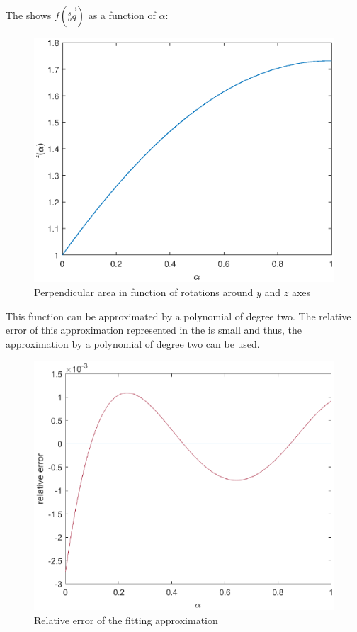 The  shows $f(\vec{ ^s_o q})$ as a function of $\alpha$:
\begin{figure}[H]
	\centering
	\includegraphics[width=1\linewidth]{figures/path_f.eps}
	\caption{Perpendicular area in function of rotations around $y$ and $z$ axes}
	\label{fig:path_alpha}
\end{figure} 
This function can be approximated by a polynomial of degree two. The relative error of this approximation represented in the  is small and thus, the approximation by a polynomial of degree two can be used. 
\begin{figure}[H]
	\centering
	\includegraphics[width=1\linewidth]{figures/rel_err.eps}
	\caption{Relative error of the fitting approximation }
	\label{fig:rel_err}
\end{figure}
